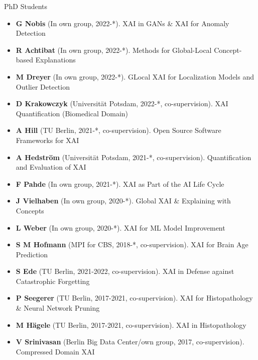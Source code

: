 
\newcommand{\supervision}[3]{\textbf{#1} (In own group, #2). {\small #3}}
\newcommand{\cosupervision}[4]{\textbf{#1} (#2, #3, co-supervision). {\small #4}}

\headedsection 
{PhD Students}
{
    \begin{itemize}
        \item [] \supervision{G Nobis}{2022-*}{XAI in GANs \& XAI for Anomaly Detection}
        \item [] \supervision{R Achtibat}{2022-*}{Methods for Global-Local Concept-based Explanations}
        \item [] \supervision{M Dreyer}{2022-*}{GLocal XAI for Localization Models and Outlier Detection}
        
        \item [] \cosupervision{D Krakowczyk}{Universität Potsdam}{2022-*}{XAI Quantification (Biomedical Domain)}
        \item [] \cosupervision{A Hill}{TU Berlin}{2021-*}{Open Source Software Frameworks for XAI}
        \item [] \cosupervision{A Hedström}{Universität Potsdam}{2021-*}{Quantification and Evaluation of XAI}

        \item [] \supervision{F Pahde}{2021-*}{XAI as Part of the AI Life Cycle}
        \item [] \supervision{J Vielhaben}{2020-*}{Global XAI \& Explaining with Concepts}
        \item [] \supervision{L Weber}{2020-*}{XAI for ML Model Improvement}  
        
        \item [] \cosupervision{S M Hofmann}{MPI for CBS}{2018-*}{XAI for Brain Age Prediction}
        
        \item [] \cosupervision{S Ede}{TU Berlin}{2021-2022}{XAI in Defense against Catastrophic Forgetting}
        \item [] \cosupervision{P Seegerer}{TU Berlin}{2017-2021}{XAI for Histopathology \& Neural Network Pruning}
        \item [] \cosupervision{M Hägele}{TU Berlin}{2017-2021}{XAI in Histopathology}
        \item [] \cosupervision{V Srinivasan}{Berlin Big Data Center/own group}{2017}{Compressed Domain XAI}
                
        
        
    \end{itemize}
}

